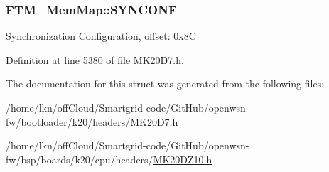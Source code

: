 \subsubsection[{\texorpdfstring{S\+Y\+N\+C\+O\+NF}{SYNCONF}}]{ F\+T\+M\+\_\+\+Mem\+Map\+::\+S\+Y\+N\+C\+O\+NF}\hypertarget{struct_f_t_m___mem_map_a3bd4b174127a80c7f8bd910b66e6de60}{}\label{struct_f_t_m___mem_map_a3bd4b174127a80c7f8bd910b66e6de60}
Synchronization Configuration, offset\+: 0x8C 

Definition at line 5380 of file M\+K20\+D7.\+h.



The documentation for this struct was generated from the following files\+:\begin{DoxyCompactItemize}
\item 
/home/lkn/off\+Cloud/\+Smartgrid-\/code/\+Git\+Hub/openwsn-\/fw/bootloader/k20/headers/\hyperlink{bootloader_2k20_2headers_2_m_k20_d7_8h}{M\+K20\+D7.\+h}\item 
/home/lkn/off\+Cloud/\+Smartgrid-\/code/\+Git\+Hub/openwsn-\/fw/bsp/boards/k20/cpu/headers/\hyperlink{_m_k20_d_z10_8h}{M\+K20\+D\+Z10.\+h}\end{DoxyCompactItemize}
